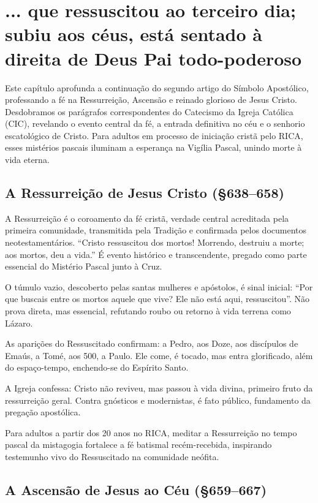\chapter{... que ressuscitou ao terceiro dia; subiu aos céus, está sentado à direita de Deus Pai todo-poderoso}

Este capítulo aprofunda a continuação do segundo artigo do Símbolo Apostólico, professando a fé na Ressurreição, Ascensão e reinado glorioso de Jesus Cristo. Desdobramos os parágrafos correspondentes do Catecismo da Igreja Católica (CIC), revelando o evento central da fé, a entrada definitiva no céu e o senhorio escatológico de Cristo. Para adultos em processo de iniciação cristã pelo RICA, esses mistérios pascais iluminam a esperança na Vigília Pascal, unindo morte à vida eterna.

\section{A Ressurreição de Jesus Cristo (\S 638--658)}

A Ressurreição é o coroamento da fé cristã, verdade central acreditada pela primeira comunidade, transmitida pela Tradição e confirmada pelos documentos neotestamentários. ``Cristo ressuscitou dos mortos! Morrendo, destruiu a morte; aos mortos, deu a vida.'' É evento histórico e transcendente, pregado como parte essencial do Mistério Pascal junto à Cruz.

O túmulo vazio, descoberto pelas santas mulheres e apóstolos, é sinal inicial: ``Por que buscais entre os mortos aquele que vive? Ele não está aqui, ressuscitou''. Não prova direta, mas essencial, refutando roubo ou retorno à vida terrena como Lázaro.

As aparições do Ressuscitado confirmam: a Pedro, aos Doze, aos discípulos de Emaús, a Tomé, aos 500, a Paulo. Ele come, é tocado, mas entra glorificado, além do espaço-tempo, enchendo-se do Espírito Santo.

A Igreja confessa: Cristo não reviveu, mas passou à vida divina, primeiro fruto da ressurreição geral. Contra gnósticos e modernistas, é fato público, fundamento da pregação apostólica.

Para adultos a partir dos 20 anos no RICA, meditar a Ressurreição no tempo pascal da mistagogia fortalece a fé batismal recém-recebida, inspirando testemunho vivo do Ressuscitado na comunidade neófita.

\section{A Ascensão de Jesus ao Céu (\S 659--667)}

